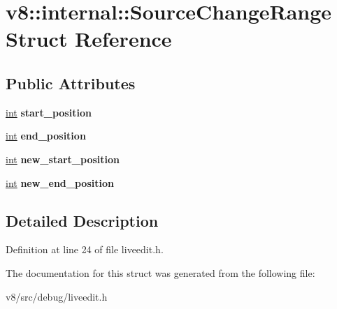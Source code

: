 \hypertarget{structv8_1_1internal_1_1SourceChangeRange}{}\section{v8\+:\+:internal\+:\+:Source\+Change\+Range Struct Reference}
\label{structv8_1_1internal_1_1SourceChangeRange}
\subsection*{Public Attributes}
\begin{DoxyCompactItemize}
\item 
\mbox{\label{structv8_1_1internal_1_1SourceChangeRange_a61a6408c381d67f5c5dab4eddc934c2c}} 
\mbox{\hyperlink{classint}{int}} {\bfseries start\+\_\+position}
\item 
\mbox{\label{structv8_1_1internal_1_1SourceChangeRange_ad056a44eb60c835de6d8e0f256db3f47}} 
\mbox{\hyperlink{classint}{int}} {\bfseries end\+\_\+position}
\item 
\mbox{\label{structv8_1_1internal_1_1SourceChangeRange_acf83c0ddcd30bfc53ba2f7a052f6e089}} 
\mbox{\hyperlink{classint}{int}} {\bfseries new\+\_\+start\+\_\+position}
\item 
\mbox{\label{structv8_1_1internal_1_1SourceChangeRange_a3062826d54e0033a0d6fc9ad8144ef1f}} 
\mbox{\hyperlink{classint}{int}} {\bfseries new\+\_\+end\+\_\+position}
\end{DoxyCompactItemize}


\subsection{Detailed Description}


Definition at line 24 of file liveedit.\+h.



The documentation for this struct was generated from the following file\+:\begin{DoxyCompactItemize}
\item 
v8/src/debug/liveedit.\+h\end{DoxyCompactItemize}
